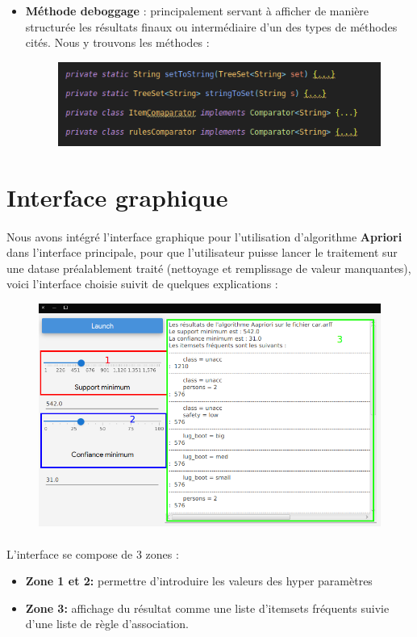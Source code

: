 \begin{itemize}
				\item \textbf{Méthode deboggage} : principalement servant à afficher de manière structurée les résultats finaux ou intermédiaire d'un des types de méthodes cités. Nous y trouvons les méthodes : 
				\begin{figure}[H]
					\centering
					\includegraphics[width=0.75\linewidth]{apriori/images/data_structs/searcher/printers.png}
				\end{figure}
			\end{itemize}
		
	\section{Interface graphique}
		\paragraph{}
		Nous avons intégré l'interface graphique pour l'utilisation d'algorithme \textbf{Apriori} dans l'interface principale, pour que l'utilisateur puisse lancer le traitement sur une datase préalablement traité (nettoyage et remplissage de valeur manquantes), voici l'interface choisie suivit de quelques explications : 
		\begin{figure}[H]
			\centering
			\includegraphics[width=0.75\linewidth]{apriori/images/apriori.png}
		\end{figure}
		\paragraph{}
		L'interface se compose de 3 zones :
		\begin{itemize}
			\item \textbf{Zone 1 et 2:} permettre d'introduire les valeurs des hyper paramètres
			\item \textbf{Zone 3:} affichage du résultat comme une liste d'itemsets fréquents suivie d'une liste de règle d'association. 
		\end{itemize}
		
